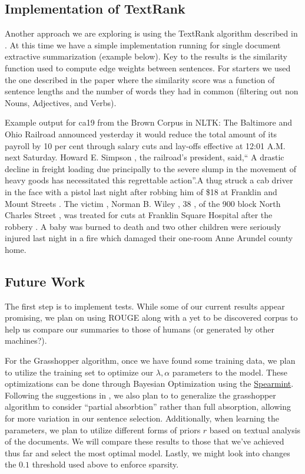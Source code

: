 \documentclass[10pt]{article}
\begin{document}
\subsection{Implementation of TextRank}

\label{sec:textrank}
Another approach we are exploring is using the TextRank algorithm described in \cite{textrank}. At this time we have a simple implementation running for single document extractive summarization (example below). Key to the results is the similarity function used to compute edge weights between sentences. For starters we used the one described in the paper where the similarity score was a function of sentence lengths and the number of words they had in common (filtering out non Nouns, Adjectives, and Verbs).

Example output for ca19 from the Brown Corpus in NLTK:
The Baltimore and Ohio Railroad announced yesterday it would reduce the total amount of its payroll by 10 per cent through salary cuts and lay-offs effective at 12:01 A.M. next Saturday. Howard E. Simpson , the railroad's president, said,`` A drastic decline in freight loading due principally to the severe slump in the movement of heavy goods has necessitated this regrettable action''.A thug struck a cab driver in the face with a pistol last night after robbing him of \$18 at Franklin and Mount Streets .
The victim , Norman B. Wiley , 38 , of the 900 block North Charles Street , was treated for cuts at Franklin Square Hospital after the robbery .
A baby was burned to death and two other children were seriously injured last night in a fire which damaged their one-room Anne Arundel county home.



\subsection{Future Work}
\label{sec:future_work}
The first step is to implement tests. While some of our current results appear promising, we plan on using ROUGE \cite{rouge} along with a yet to be discovered corpus to help us compare our summaries to those of humans (or generated by other machines?).

For the Grasshopper algorithm, once we have found some training data, we plan to utilize the training set to optimize our $\lambda, \alpha$ parameters to the model. These optimizations can be done through Bayesian Optimization using the \href{https://github.com/HIPS/Spearmint}{Spearmint}. Following the suggestions in \cite{grasshopper}, we also plan to to generalize the grasshopper algorithm to consider ``partial absorbtion'' rather than full absorption, allowing for more variation in our sentence selection. Additionally, when learning the parameters, we plan to utilize different forms of priors $r$ based on textual analysis of the documents. We will compare these results to those that we've achieved thus far and select the most optimal model. Lastly, we might look into changes the $0.1$ threshold used above to enforce sparsity.
\end{document}
